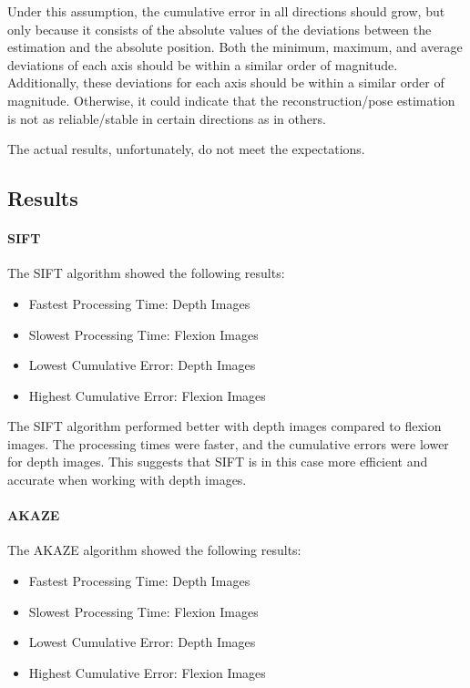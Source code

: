 \documentclass[conference, a4paper]{IEEEtran}
\begin{document}
Under this assumption, the cumulative error in all directions should grow, but only because it consists of the absolute values of the deviations between the estimation and the absolute position. Both the minimum, maximum, and average deviations of each axis should be within a similar order of magnitude. Additionally, these deviations for each axis should be within a similar order of magnitude. Otherwise, it could indicate that the reconstruction/pose estimation is not as reliable/stable in certain directions as in others.

The actual results, unfortunately, do not meet the expectations.
\subsection{Results}
\paragraph{SIFT}
The SIFT algorithm showed the following results:

\begin{itemize}
	\item Fastest Processing Time: Depth Images
	\item Slowest Processing Time: Flexion Images
	\item Lowest Cumulative Error: Depth Images
	\item Highest Cumulative Error: Flexion Images
\end{itemize}

The SIFT algorithm performed better with depth images compared to flexion images. The processing times were faster, and the cumulative errors were lower for depth images. This suggests that SIFT is in this case more efficient and accurate when working with depth images.

\paragraph{AKAZE}
The AKAZE algorithm showed the following results:

\begin{itemize}
	\item Fastest Processing Time: Depth Images
	\item Slowest Processing Time: Flexion Images
	\item Lowest Cumulative Error: Depth Images
	\item Highest Cumulative Error: Flexion Images
\end{itemize}
\end{document}
